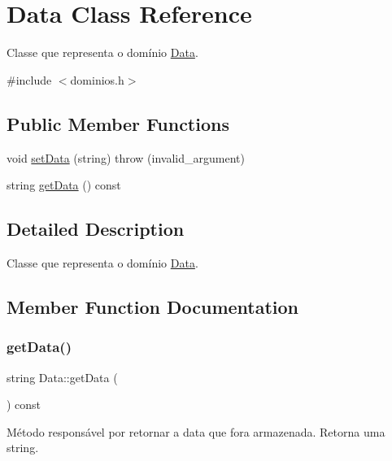 \hypertarget{classData}{}\section{Data Class Reference}
\label{classData}


Classe que representa o domínio \hyperlink{classData}{Data}.  




{\ttfamily \#include $<$dominios.\+h$>$}

\subsection*{Public Member Functions}
\begin{DoxyCompactItemize}
\item 
void \hyperlink{classData_a75a50f88bc966f20826a3959717a5acc}{set\+Data} (string)  throw (invalid\+\_\+argument)
\item 
string \hyperlink{classData_a13f25eafdc138d743e99eb4086d765a2}{get\+Data} () const
\end{DoxyCompactItemize}


\subsection{Detailed Description}
Classe que representa o domínio \hyperlink{classData}{Data}. 

\subsection{Member Function Documentation}
\mbox{\label{classData_a13f25eafdc138d743e99eb4086d765a2}} 
\subsubsection{\texorpdfstring{get\+Data()}{getData()}}
{\footnotesize\ttfamily string Data\+::get\+Data (\begin{DoxyParamCaption}{ }\end{DoxyParamCaption}) const\hspace{0.3cm}{\ttfamily [inline]}}

Método responsável por retornar a data que fora armazenada. Retorna uma string. \mbox{\label{classData_a75a50f88bc966f20826a3959717a5acc}} 
